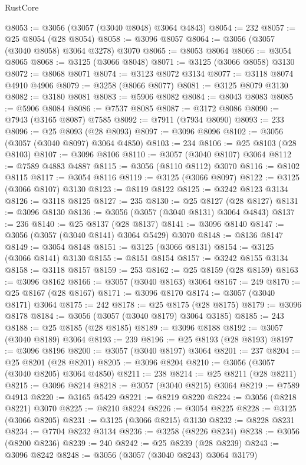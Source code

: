 \begin{lexlean}{RustCore}
\begin{coremodule}
@8053 := @3056 (@3057 (@3040 @8048) @3064 @4843)
@8054 := 232
@8057 := @25 @8054 (@28 @8054)
@8058 := @3096 @8057
@8064 := @3056 (@3057 (@3040 @8058) @3064 @3278) @3070
@8065 := @8053 @8064
@8066 := @3054 @8065
@8068 := @3125 (@3066 @8048)
@8071 := @3125 (@3066 @8058) @3130
@8072 := @8068 @8071
@8074 := @3123 @8072 @3134
@8077 := @3118 @8074 @4910 @4906
@8079 := @3258 (@8066 @8077)
@8081 := @3125 @8079 @3130
@8082 := @3180 @8081
@8083 := @5906 @8082
@8084 := @8043 @8083
@8085 := @5906 @8084
@8086 := @7537 @8085
@8087 := @3172 @8086
@8090 := @7943 (@3165 @8087) @7585
@8092 := @7911 (@7934 @8090)
@8093 := 233
@8096 := @25 @8093 (@28 @8093)
@8097 := @3096 @8096
@8102 := @3056 (@3057 (@3040 @8097) @3064 @4850)
@8103 := 234
@8106 := @25 @8103 (@28 @8103)
@8107 := @3096 @8106
@8110 := @3057 (@3040 @8107) @3064
@8112 := @7589 @4883 @4887
@8115 := @3056 (@8110 @8112) @3070
@8116 := @8102 @8115
@8117 := @3054 @8116
@8119 := @3125 (@3066 @8097)
@8122 := @3125 (@3066 @8107) @3130
@8123 := @8119 @8122
@8125 := @3242 @8123 @3134
@8126 := @3118 @8125
@8127 := 235
@8130 := @25 @8127 (@28 @8127)
@8131 := @3096 @8130
@8136 := @3056 (@3057 (@3040 @8131) @3064 @4843)
@8137 := 236
@8140 := @25 @8137 (@28 @8137)
@8141 := @3096 @8140
@8147 := @3056 (@3057 (@3040 @8141) @3064 @5429) @3070
@8148 := @8136 @8147
@8149 := @3054 @8148
@8151 := @3125 (@3066 @8131)
@8154 := @3125 (@3066 @8141) @3130
@8155 := @8151 @8154
@8157 := @3242 @8155 @3134
@8158 := @3118 @8157
@8159 := 253
@8162 := @25 @8159 (@28 @8159)
@8163 := @3096 @8162
@8166 := @3057 (@3040 @8163) @3064
@8167 := 249
@8170 := @25 @8167 (@28 @8167)
@8171 := @3096 @8170
@8174 := @3057 (@3040 @8171) @3064
@8175 := 242
@8178 := @25 @8175 (@28 @8175)
@8179 := @3096 @8178
@8184 := @3056 (@3057 (@3040 @8179) @3064 @3185)
@8185 := 243
@8188 := @25 @8185 (@28 @8185)
@8189 := @3096 @8188
@8192 := @3057 (@3040 @8189) @3064
@8193 := 239
@8196 := @25 @8193 (@28 @8193)
@8197 := @3096 @8196
@8200 := @3057 (@3040 @8197) @3064
@8201 := 237
@8204 := @25 @8201 (@28 @8201)
@8205 := @3096 @8204
@8210 := @3056 (@3057 (@3040 @8205) @3064 @4850)
@8211 := 238
@8214 := @25 @8211 (@28 @8211)
@8215 := @3096 @8214
@8218 := @3057 (@3040 @8215) @3064
@8219 := @7589 @4913
@8220 := @3165 @5429
@8221 := @8219 @8220
@8224 := @3056 (@8218 @8221) @3070
@8225 := @8210 @8224
@8226 := @3054 @8225
@8228 := @3125 (@3066 @8205)
@8231 := @3125 (@3066 @8215) @3130
@8232 := @8228 @8231
@8234 := @7704 @8232 @3134
@8236 := @3258 (@8226 @8234)
@8238 := @3056 (@8200 @8236)
@8239 := 240
@8242 := @25 @8239 (@28 @8239)
@8243 := @3096 @8242
@8248 := @3056 (@3057 (@3040 @8243) @3064 @3179)

\end{coremodule}
\end{lexlean}
